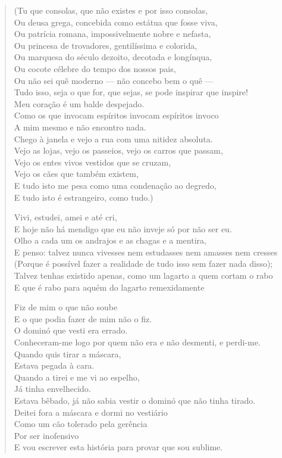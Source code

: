 \documentclass[10pt,a5paper,oneside]{book}
\begin{document}
\begin{verse}
(Tu que consolas, que não existes e por isso consolas,\\
Ou deusa grega, concebida como estátua que fosse viva,\\
Ou patrícia romana, impossivelmente nobre e nefasta,\\
Ou princesa de trovadores, gentilíssima e colorida,\\
Ou marquesa do século dezoito, decotada e longínqua,\\
Ou cocote célebre do tempo dos nossos pais,\\
Ou não sei quê moderno --- não concebo bem o quê ---\\
Tudo isso, seja o que for, que sejas, se pode inspirar que inspire!\\
Meu coração é um balde despejado.\\
Como os que invocam espíritos invocam espíritos invoco\\
A mim mesmo e não encontro nada.\\
Chego à janela e vejo a rua com uma nitidez absoluta.\\
Vejo as lojas, vejo os passeios, vejo os carros que passam,\\
Vejo os entes vivos vestidos que se cruzam,\\
Vejo os cães que também existem,\\
E tudo isto me pesa como uma condenação ao degredo,\\
E tudo isto é estrangeiro, como tudo.)

Vivi, estudei, amei e até cri,\\
E hoje não há mendigo que eu não inveje só por não ser eu.\\
Olho a cada um os andrajos e as chagas e a mentira,\\
E penso: talvez nunca vivesses nem estudasses nem amasses nem cresses\\
(Porque é possível fazer a realidade de tudo isso sem fazer nada disso);\\
Talvez tenhas existido apenas, como um lagarto a quem cortam o rabo\\
E que é rabo para aquém do lagarto remexidamente

Fiz de mim o que não soube\\
E o que podia fazer de mim não o fiz.\\
O dominó que vesti era errado.\\
Conheceram-me logo por quem não era e não desmenti, e perdi-me.\\
Quando quis tirar a máscara,\\
Estava pegada à cara.\\
Quando a tirei e me vi ao espelho,\\
Já tinha envelhecido.\\
Estava bêbado, já não sabia vestir o dominó que não tinha tirado.\\
Deitei fora a máscara e dormi no vestiário\\
Como um cão tolerado pela gerência\\
Por ser inofensivo\\
E vou escrever esta história para provar que sou sublime.


\end{verse}
\end{document}
